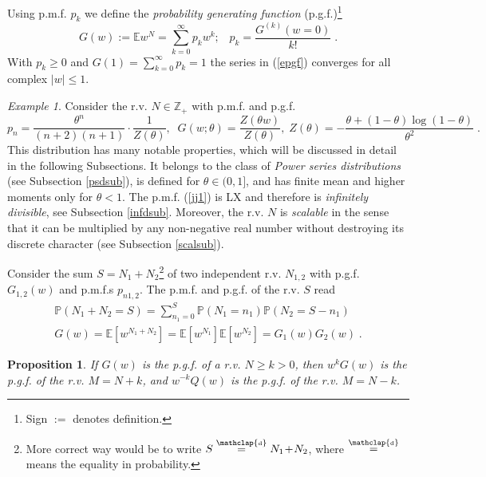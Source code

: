 \documentclass[a4paper,12pt]{amsart}
\newcommand{\Z}{\mathbb{Z}_{+}}
\newcommand\preq{\stackrel{\scriptstyle \mathclap{\mbox{\tiny d}}}{=}}
\newtheorem{Proposition}{Proposition}[section]
\theoremstyle{definition}
\theoremstyle{remark}
\newtheorem{Example}{Example}[section]
\begin{document}
Using p.m.f. $p_k$ we define the {\it probability generating function} (p.g.f.)\footnote{Sign $:=$ denotes definition.}
\begin{equation}\label{epgf}
G(w):=\mathbb E w^N= \sum_{k=0}^{\infty}p_{k}w^{k};\;\;\; p_k=\frac{G^{(k)}(w =0)}{k!}\;.
\end{equation}
With $p_k \geq 0$ and $G(1)=\sum_{k=0}^{\infty}p_k =1$ the series in (\ref{epgf}) converges for all complex $|w|\leq 1$.  

\begin{Example}
    Consider the r.v. $N\in\Z$ with p.m.f. and p.g.f.
\begin{equation}\label{jj1}
p_n=\frac{\theta^n}{(n+2)(n+1)}\cdot\frac{{1}}{Z(\theta)},\;\; G(w;\theta)=\frac{Z(\theta w)}{Z(\theta)},\; Z(\theta)=-
\frac{\theta + (1-\theta) \log (1-\theta)}{\theta ^2}\;.   
\end{equation}
This distribution has many notable properties, which will be discussed in detail in the following Subsections. It belongs to the class of {\it Power series distributions} (see Subsection \ref{psdsub}), is defined for $\theta \in (0,1]$, and has finite mean and higher moments only for $\theta<1$. The p.m.f. (\ref{jj1}) is LX and therefore is {\it infinitely divisible}, see Subsection \ref{infdsub}. Moreover, the r.v. $N$ is {\it scalable} in the sense that it can be multiplied by any non-negative real number without destroying its discrete character (see Subsection \ref{scalsub}).

\end{Example}

Consider the sum $S = N_1 + N_2$\footnote{More correct way would be to write  $S \preq N_1\!+\!N_2$, where $\preq$ means the equality in probability.} of two independent r.v. $N_{1,2}$ with p.g.f. $G_{1,2}(w)$ and p.m.f.{}s  $p_{n1,2}$. The p.m.f. and p.g.f. of the r.v. $S$ read   
\begin{eqnarray}
\mathbb{P}(N_1\!+\!N_2\!=\!S) =\sum_{n_1=0}^S \mathbb{P}(N_1\!=\!n_1)\mathbb{P}(N_2\!=\!S\!-\!n_1) 
\\
 G(w) = \mathbb{E}[w^{N_1+N_2}] = \mathbb{E}[w^{N_1}] \mathbb{E}[w^{N_2}] =G_1(w)G_2(w)\;. 
 \label{eq: prodpgf}
\end{eqnarray}
\begin{Proposition} \label{PGSwk}
If $G(w)$ is the p.g.f. of a r.v. $N\geq k>0$, then $w^k G(w)$ is the p.g.f. of the r.v. 
$ M=N+k$, and $w^{-k} Q(w)$ is the p.g.f. of the r.v. $M=N-k$.
\end{Proposition}
\end{document}
